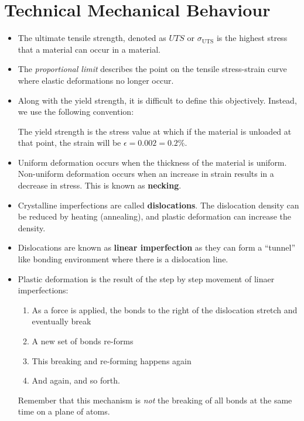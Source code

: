 \section{Technical Mechanical Behaviour}
\begin{itemize}
    \item The ultimate tensile strength, denoted as $UTS$ or $\sigma_\text{UTS}$ is the highest stress that a material can occur in a material.
    \item The \textit{proportional limit} describes the point on the tensile stress-strain curve where elastic deformations no longer occur.
    \item Along with the yield strength, it is difficult to define this objectively. Instead, we use the following convention:
    \begin{definition}
        The yield strength is the stress value at which if the material is unloaded at that point, the strain will be $\epsilon = 0.002 = 0.2\%$.
    \end{definition}
    \item Uniform deformation occurs when the thickness of the material is uniform. Non-uniform deformation occurs when an increase in strain results in a decrease in stress. This is known as \textbf{necking}.
    \item Crystalline imperfections are called \textbf{dislocations}. The dislocation density can be reduced by heating (annealing), and plastic deformation can increase the density.
    \item Dislocations are known as \textbf{linear imperfection} as they can form a ``tunnel'' like bonding environment where there is a dislocation line.
    \item Plastic deformation is the result of the step by step movement of linaer imperfections:
    \begin{enumerate}
        \item As a force is applied, the bonds to the right of the dislocation stretch and eventually break
        \item A new set of bonds re-forms
        \item This breaking and re-forming happens again
        \item And again, and so forth.
    \end{enumerate}
    \begin{warning}
        Remember that this mechanism is \textit{not} the breaking of all bonds at the same time on a plane of atoms.
    \end{warning}
\end{itemize}